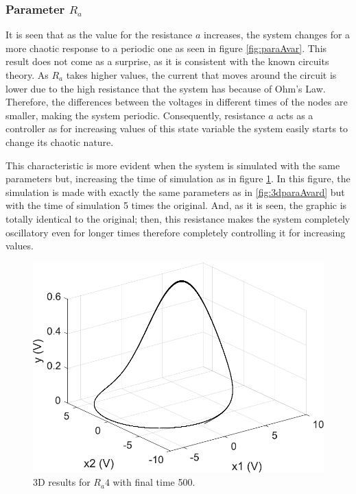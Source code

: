 \subsubsection{Parameter \texorpdfstring{$R_a$}{Ra}}
It is seen that as the value for the resistance $a$ increases, the system changes for a more chaotic response to a periodic one as seen in figure \ref{fig:paraAvar}. This result does not come as a surprise, as it is consistent with the known circuits theory. As $R_a$ takes higher values, the current that moves around the circuit is lower due to the high resistance that the system has because of Ohm's Law. Therefore, the differences between the voltages in different times of the nodes are smaller, making the system periodic. Consequently, resistance $a$ acts as a controller as for increasing values of this state variable the system easily starts to change its chaotic nature.

This characteristic is more evident when the system is simulated with the same parameters but, increasing the time of simulation as in figure \ref{fig:ra500}. In this figure, the simulation is made with exactly the same parameters as in \ref{fig:3dparaAvard} but with the time of simulation 5 times the original. And, as it is seen, the graphic is totally identical to the original; then, this resistance makes the system completely oscillatory even for longer times therefore completely controlling it for increasing values.

\begin{figure}[H]
    \centering
    \includegraphics[scale=0.5]{figs/ra3652t500.pdf}
    \caption{3D results for $R_a4$ with final time 500.}
    \label{fig:ra500}
\end{figure}

